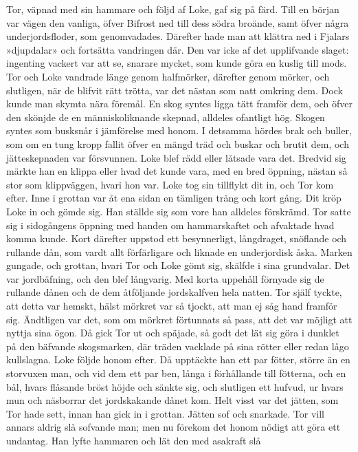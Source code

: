 Tor, väpnad med sin hammare och följd af Loke, gaf sig på färd. Till en
början var vägen den vanliga, öfver Bifrost ned till dess södra broände,
samt öfver några underjordsfloder, som genomvadades. Därefter hade man
att klättra ned i Fjalars »djupdalar» och fortsätta vandringen där. Den
var icke af det upplifvande slaget: ingenting vackert var att se,
snarare mycket, som kunde göra en kuslig till mods. Tor och Loke
vandrade länge genom halfmörker, därefter genom mörker, och slutligen,
när de blifvit rätt trötta, var det nästan som natt omkring dem. Dock
kunde man skymta
nära föremål. En skog syntes ligga tätt framför dem, och öfver den
skönjde de en människoliknande skepnad, alldeles ofantligt hög. Skogen
syntes som busksnår i jämförelse med honom. I detsamma hördes brak och
buller, som om en tung kropp fallit öfver en mängd träd och buskar och
brutit dem, och jätteskepnaden var försvunnen. Loke blef rädd eller
låtsade vara det. Bredvid sig märkte han en klippa eller hvad det kunde
vara, med en bred öppning, nästan så stor som klippväggen, hvari hon
var. Loke tog sin tillflykt dit in, och Tor kom efter. Inne i grottan
var åt ena sidan en tämligen trång och kort gång. Dit kröp Loke in och
gömde sig. Han ställde sig som vore han alldeles förskrämd. Tor satte
sig i sidogångens öppning med handen om hammarskaftet och afvaktade hvad
komma kunde. Kort därefter uppstod ett besynnerligt, långdraget,
snöflande och rullande dån, som vardt allt förfärligare och liknade en
underjordisk åska. Marken gungade, och grottan, hvari Tor och Loke gömt
sig, skälfde i sina grundvalar. Det var jordbäfning, och den blef
långvarig. Med korta uppehåll förnyade sig de rullande dånen och de dem
åtföljande jordskalfven hela natten. Tor själf tyckte, att detta var
hemskt, hälst mörkret var så tjockt, att man ej såg hand framför sig.
Ändtligen var det, som om mörkret förtunnats så pass, att det var
möjligt att nyttja sina ögon. Då gick Tor ut och späjade, så godt det
lät sig göra i dunklet på den bäfvande skogsmarken, där träden vacklade
på sina rötter eller redan lågo kullslagna. Loke följde honom efter. Då
upptäckte han ett par fötter, större än en storvuxen man, och vid dem
ett par ben, långa i förhållande till fötterna, och en bål, hvars
flåsande bröst höjde och sänkte sig, och slutligen ett hufvud, ur hvars
mun och näsborrar det jordskakande dånet kom. Helt visst var det jätten,
som Tor hade sett, innan han gick in i grottan. Jätten sof och snarkade.
Tor vill annars aldrig slå sofvande man; men nu förekom det honom nödigt
att göra ett undantag. Han lyfte hammaren och lät den med asakraft slå
